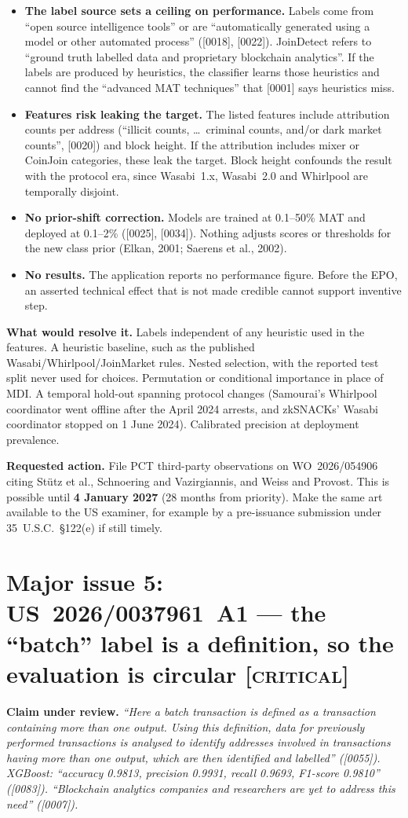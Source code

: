 \documentclass[10pt,a4paper]{article}
\newcommand{\claim}[1]{\noindent\textbf{Claim under review.} \emph{#1}\par\smallskip}
\newcommand{\sev}[1]{\textsc{\color{BrickRed}[#1]}}
\newcommand{\req}[1]{\noindent\textbf{What would resolve it.} #1\par}
\newcommand{\act}[1]{\noindent\textbf{Requested action.} #1\par}
\begin{document}
\begin{itemize}
  \item \textbf{The label source sets a ceiling on performance.} Labels come from ``open source intelligence tools'' or are ``automatically generated using a model or other automated process'' ([0018], [0022]). JoinDetect refers to ``ground truth labelled data and proprietary blockchain analytics''. If the labels are produced by heuristics, the classifier learns those heuristics and cannot find the ``advanced MAT techniques'' that [0001] says heuristics miss.
  \item \textbf{Features risk leaking the target.} The listed features include attribution counts per address (``illicit counts, \ldots\ criminal counts, and/or dark market counts'', [0020]) and block height. If the attribution includes mixer or CoinJoin categories, these leak the target. Block height confounds the result with the protocol era, since Wasabi~1.x, Wasabi~2.0 and Whirlpool are temporally disjoint.
  \item \textbf{No prior-shift correction.} Models are trained at 0.1--50\% MAT and deployed at 0.1--2\% ([0025], [0034]). Nothing adjusts scores or thresholds for the new class prior (Elkan, 2001; Saerens et al., 2002).
  \item \textbf{No results.} The application reports no performance figure. Before the EPO, an asserted technical effect that is not made credible cannot support inventive step.
\end{itemize}
\req{Labels independent of any heuristic used in the features. A heuristic baseline, such as the published Wasabi/Whirlpool/JoinMarket rules. Nested selection, with the reported test split never used for choices. Permutation or conditional importance in place of MDI. A temporal hold-out spanning protocol changes (Samourai's Whirlpool coordinator went offline after the April 2024 arrests, and zkSNACKs' Wasabi coordinator stopped on 1 June 2024). Calibrated precision at deployment prevalence.}

\act{File PCT third-party observations on WO~2026/054906 citing St\"utz et al., Schnoering and Vazirgiannis, and Weiss and Provost. This is possible until \textbf{4 January 2027} (28 months from priority). Make the same art available to the US examiner, for example by a pre-issuance submission under 35~U.S.C.~\S122(e) if still timely.}

\section{Major issue 5: US~2026/0037961~A1 --- the ``batch'' label is a definition, so the evaluation is circular \sev{critical}}\label{sec:batch}
\claim{``Here a batch transaction is defined as a transaction containing more than one output. Using this definition, data for previously performed transactions is analysed to identify addresses involved in transactions having more than one output, which are then identified and labelled'' ([0055]). XGBoost: ``accuracy 0.9813, precision 0.9931, recall 0.9693, F1-score 0.9810'' ([0083]). ``Blockchain analytics companies and researchers are yet to address this need'' ([0007]).}
\end{document}
